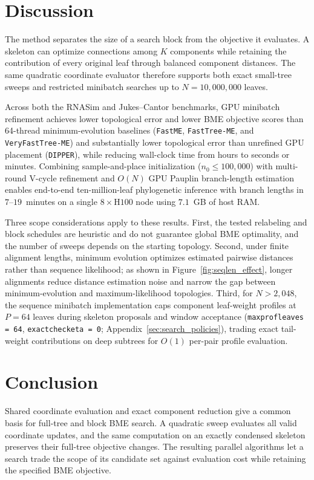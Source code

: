 \documentclass[11pt,a4paper]{article}
\makeatletter
\DeclareRobustCommand{\_}{\ifmmode\nfss@text{\textunderscore}\else\textunderscore\allowbreak\fi}
\theoremstyle{definition}
\makeatother
\begin{document}
\section{Discussion}

The method separates the size of a search block from the objective it evaluates.
A skeleton can optimize connections among $K$ components while retaining the contribution of every original leaf through balanced component distances.
The same quadratic coordinate evaluator therefore supports both exact small-tree sweeps and restricted minibatch searches up to $N=10{,}000{,}000$ leaves.

Across both the RNASim and Jukes--Cantor benchmarks, GPU minibatch refinement achieves lower topological error and lower BME objective scores than 64-thread minimum-evolution baselines (\texttt{FastME}, \texttt{FastTree-ME}, and \texttt{VeryFastTree-ME}) and substantially lower topological error than unrefined GPU placement (\texttt{DIPPER}), while reducing wall-clock time from hours to seconds or minutes.
Combining sample-and-place initialization ($n_0\le 100{,}000$) with multi-round V-cycle refinement and $O(N)$ GPU Pauplin branch-length estimation enables end-to-end ten-million-leaf phylogenetic inference with branch lengths in $7\text{--}19$~minutes on a single $8\times\text{H100}$ node using $7.1$~GB of host RAM.

Three scope considerations apply to these results.
First, the tested relabeling and block schedules are heuristic and do not guarantee global BME optimality, and the number of sweeps depends on the starting topology.
Second, under finite alignment lengths, minimum evolution optimizes estimated pairwise distances rather than sequence likelihood; as shown in Figure~\ref{fig:seqlen_effect}, longer alignments reduce distance estimation noise and narrow the gap between minimum-evolution and maximum-likelihood topologies.
Third, for $N>2{,}048$, the sequence minibatch implementation caps component leaf-weight profiles at $P=64$ leaves during skeleton proposals and window acceptance (\texttt{max\_prof\_leaves = 64}, \texttt{exact\_check\_eta = 0}; Appendix~\ref{sec:search_policies}), trading exact tail-weight contributions on deep subtrees for $O(1)$ per-pair profile evaluation.

\section{Conclusion}

Shared coordinate evaluation and exact component reduction give a common basis for full-tree and block BME search.
A quadratic sweep evaluates all valid coordinate updates, and the same computation on an exactly condensed skeleton preserves their full-tree objective changes.
The resulting parallel algorithms let a search trade the scope of its candidate set against evaluation cost while retaining the specified BME objective.



\clearpage
\appendix

\end{document}
